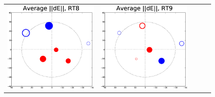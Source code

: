 \documentclass[]{aa}
\begin{document}
\begin{figure}
\begin{tabular}{@{}c@{}c@{}c@{}c@{}c@{}}
\includegraphics[width=\roguewidth]{o2006_dE_ant8} &
\includegraphics[width=\roguewidth]{o2006_dE_ant9} \\

\end{tabular}
\end{figure}
\end{document}
